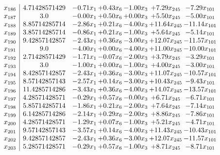 \documentclass[8pt]{article}
\begin{document}
\[\begin{array}{c| c c@{\hskip 2pt} c@{\hskip 2pt} c@{\hskip 2pt} c@{\hskip 2pt} c@{\hskip 2pt} }
 x_{186}   &  4.71428571429 & -0.71 x_{1} & +  0.43 x_{6} & -1.00 x_{3} & +  7.29 x_{245} & -7.29 x_{101}\\
 x_{187}   &  3.0 & -0.00 x_{1} & +  0.50 x_{6} & +  0.00 x_{3} & +  5.50 x_{245} & -5.00 x_{101}\\
 x_{188}   &  8.85714285714 & -2.86 x_{1} & +  0.21 x_{6} & -4.00 x_{3} & + 11.64 x_{245} & -11.14 x_{101}\\
 x_{189}   &  3.85714285714 & -0.86 x_{1} & +  0.21 x_{6} & -1.00 x_{3} & +  5.64 x_{245} & -5.14 x_{101}\\
 x_{190}   &  9.42857142857 & -2.43 x_{1} & +  0.36 x_{6} & -3.00 x_{3} & + 12.07 x_{245} & -11.57 x_{101}\\
 x_{191}   &  9.0 & -4.00 x_{1} & +  0.00 x_{6} & -4.00 x_{3} & + 11.00 x_{245} & -10.00 x_{101}\\
 x_{192}   &  2.71428571429 & -1.71 x_{1} & -0.07 x_{6} & -2.00 x_{3} & +  3.79 x_{245} & -3.29 x_{101}\\
 x_{193}   &  3.0 & -1.00 x_{1} & +  0.00 x_{6} & -1.00 x_{3} & +  4.00 x_{245} & -3.00 x_{101}\\
 x_{194}   &  8.42857142857 & -2.43 x_{1} & +  0.36 x_{6} & -3.00 x_{3} & + 11.07 x_{245} & -10.57 x_{101}\\
 x_{195}   &  8.57142857143 & -2.57 x_{1} & +  0.14 x_{6} & -3.00 x_{3} & + 10.43 x_{245} & -9.43 x_{101}\\
 x_{196}   &  11.4285714286 & -3.43 x_{1} & +  0.36 x_{6} & -4.00 x_{3} & + 14.07 x_{245} & -13.57 x_{101}\\
 x_{197}   &  4.28571428571 & -0.29 x_{1} & +  0.57 x_{6} & -0.00 x_{3} & +  6.71 x_{245} & -6.71 x_{101}\\
 x_{198}   &  5.85714285714 & -1.86 x_{1} & +  0.21 x_{6} & -2.00 x_{3} & +  7.64 x_{245} & -7.14 x_{101}\\
 x_{199}   &  6.14285714286 & -2.14 x_{1} & +  0.29 x_{6} & -2.00 x_{3} & +  8.86 x_{245} & -7.86 x_{101}\\
 x_{200}   &  4.28571428571 & -1.29 x_{1} & +  0.07 x_{6} & -1.00 x_{3} & +  5.21 x_{245} & -4.71 x_{101}\\
 x_{201}   &  9.57142857143 & -3.57 x_{1} & +  0.14 x_{6} & -4.00 x_{3} & + 11.43 x_{245} & -10.43 x_{101}\\
 x_{202}   &  9.42857142857 & -2.43 x_{1} & +  0.36 x_{6} & -3.00 x_{3} & + 12.07 x_{245} & -11.57 x_{101}\\
 x_{203}   &  5.28571428571 & -0.29 x_{1} & +  0.57 x_{6} & -1.00 x_{3} & +  8.71 x_{245} & -8.71 x_{101}\\

\end{array}\]
\end{document}

